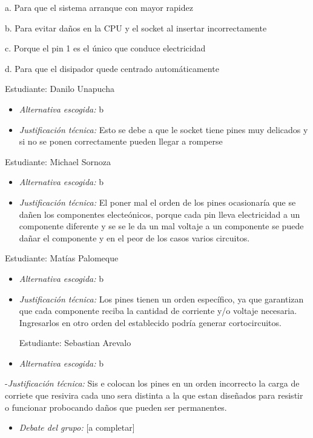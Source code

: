 \documentclass{article}
\begin{document}
a. Para que el sistema arranque con mayor rapidez 

b. Para evitar daños en la CPU y el socket al insertar incorrectamente

c. Porque el pin 1 es el único que conduce electricidad 

d. Para que el disipador quede centrado automáticamente

Estudiante: Danilo Unapucha

\begin{itemize}
\item \emph{Alternativa escogida:} b
\item \emph{Justificación técnica:} Esto se debe a que le socket tiene pines
muy delicados y si no se ponen correctamente pueden llegar a
romperse
\end{itemize}

Estudiante: Michael Sornoza 

\begin{itemize}
\item \emph{Alternativa escogida:} b
\item \emph{Justificación técnica:} El poner mal el orden de los pines ocasionaría que se dañen
los componentes electeónicos, porque cada pin lleva electricidad a un componente
diferente y se se le da un mal voltaje a un componente se puede dañar el componente
y en el peor de los casos varios circuitos.
\end{itemize}

Estudiante: Matías Palomeque

\begin{itemize}
\item \emph{Alternativa escogida:} b
\item \emph{Justificación técnica:} Los pines tienen un orden específico, ya
que garantizan que cada componente reciba la cantidad de corriente
y/o voltaje necesaria. Ingresarlos en otro orden del establecido
podría generar cortocircuitos.

Estudiante: Sebastian Arevalo

\item \emph{Alternativa escogida:} b
\end{itemize}
-\emph{Justificación técnica:} Sis e colocan los pines en un orden
incorrecto la carga de corriete que resivira cada uno sera distinta a
la que estan diseñados para resistir o funcionar probocando daños que
pueden ser permanentes. 

\begin{itemize}
\item \emph{Debate del grupo:} [a completar]
\end{itemize}
\end{document}
